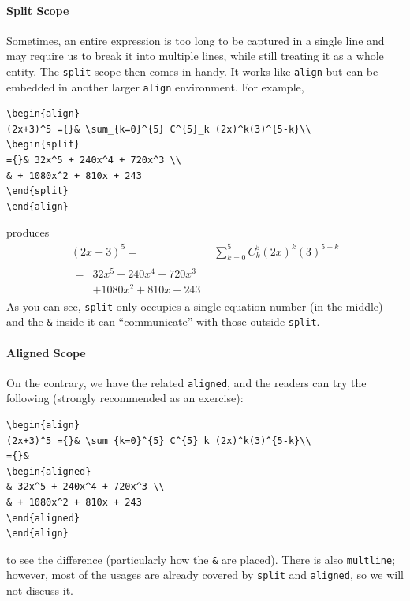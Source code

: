 \paragraph{Split Scope}
Sometimes, an entire expression is too long to be captured in a single line and may require us to break it into multiple lines, while still treating it as a whole entity. The \texttt{split} scope then comes in handy. It works like \texttt{align} but can be embedded in another larger \texttt{align} environment. For example,
\begin{lstlisting}
\begin{align}
(2x+3)^5 ={}& \sum_{k=0}^{5} C^{5}_k (2x)^k(3)^{5-k}\\
\begin{split}
={}& 32x^5 + 240x^4 + 720x^3 \\  
& + 1080x^2 + 810x + 243
\end{split}    
\end{align}
\end{lstlisting}
produces
\begin{align}
(2x+3)^5 ={}& \sum_{k=0}^{5} C^{5}_k (2x)^k(3)^{5-k}\\
\begin{split}
={}& 32x^5 + 240x^4 + 720x^3 \\  
& + 1080x^2 + 810x + 243
\end{split}    
\end{align}
As you can see, \texttt{split} only occupies a single equation number (in the middle) and the \texttt{\&} inside it can “communicate” with those outside \texttt{split}. 

\paragraph{Aligned Scope}
On the contrary, we have the related \texttt{aligned}, and the readers can try the following (strongly recommended as an exercise):
\begin{lstlisting}
\begin{align}
(2x+3)^5 ={}& \sum_{k=0}^{5} C^{5}_k (2x)^k(3)^{5-k}\\
={}&
\begin{aligned}
& 32x^5 + 240x^4 + 720x^3 \\  
& + 1080x^2 + 810x + 243
\end{aligned}    
\end{align}
\end{lstlisting}
to see the difference (particularly how the \texttt{\&} are placed). There is also \texttt{multline}; however, most of the usages are already covered by \texttt{split} and \texttt{aligned}, so we will not discuss it.

